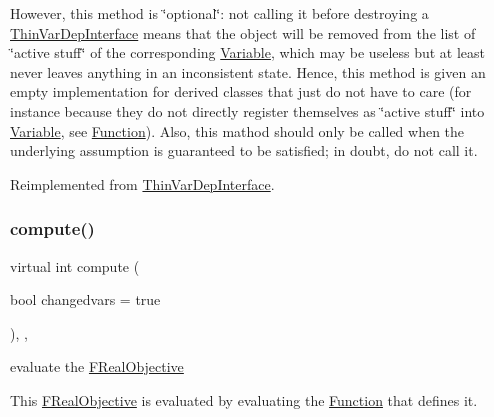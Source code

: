 However, this method is \char`\"{}optional\char`\"{}\+: not calling it before destroying a \mbox{\hyperlink{class_s_m_spp__di__unipi__it_1_1_thin_var_dep_interface}{Thin\+Var\+Dep\+Interface}} means that the object will be removed from the list of \char`\"{}active stuff\char`\"{} of the corresponding \mbox{\hyperlink{class_s_m_spp__di__unipi__it_1_1_variable}{Variable}}, which may be useless but at least never leaves anything in an inconsistent state. Hence, this method is given an empty implementation for derived classes that just do not have to care (for instance because they do not directly register themselves as \char`\"{}active stuff\char`\"{} into \mbox{\hyperlink{class_s_m_spp__di__unipi__it_1_1_variable}{Variable}}, see \mbox{\hyperlink{class_s_m_spp__di__unipi__it_1_1_function}{Function}}). Also, this mathod should only be called when the underlying assumption is guaranteed to be satisfied; in doubt, do not call it. 

Reimplemented from \mbox{\hyperlink{group___thin_var_dep_interface___c_l_a_s_s_e_s_gae16067de85b435fac4ce8558b193a99a}{Thin\+Var\+Dep\+Interface}}.

\mbox{\label{class_s_m_spp__di__unipi__it_1_1_f_real_objective_afc8ff54ab05d22f4cca0fb0bfbeb7a49}} 
\subsubsection{\texorpdfstring{compute()}{compute()}}
{\footnotesize\ttfamily virtual int compute (\begin{DoxyParamCaption}\item[{bool}]{changedvars = {\ttfamily true} }\end{DoxyParamCaption})\hspace{0.3cm}{\ttfamily [inline]}, {\ttfamily [override]}, {\ttfamily [virtual]}}



evaluate the \mbox{\hyperlink{class_s_m_spp__di__unipi__it_1_1_f_real_objective}{F\+Real\+Objective}} 

This \mbox{\hyperlink{class_s_m_spp__di__unipi__it_1_1_f_real_objective}{F\+Real\+Objective}} is evaluated by evaluating the \mbox{\hyperlink{class_s_m_spp__di__unipi__it_1_1_function}{Function}} that defines it. 

